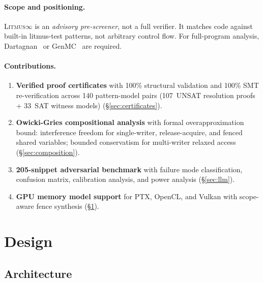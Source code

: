 \documentclass[11pt]{article}
\newcommand{\litmus}{\textsc{Litmus$\infty$}}
\begin{document}
\paragraph{Scope and positioning.}
\litmus{} is an \emph{advisory pre-screener}, not a full verifier.
It matches code against built-in litmus-test patterns, not
arbitrary control flow.  For full-program analysis, Dartagnan~\cite{Gavrilenko2019}
or GenMC~\cite{Kokologiannakis2019} are required.

\paragraph{Contributions.}
\begin{enumerate}[nosep]
\item \textbf{Verified proof certificates} with 100\% structural
  validation and 100\% SMT re-verification across 140 pattern-model
  pairs (107~UNSAT resolution proofs + 33~SAT witness models)
  (\S\ref{sec:certificates}).
\item \textbf{Owicki-Gries compositional analysis} with formal
  overapproximation bound: interference freedom for single-writer,
  release-acquire, and fenced shared variables; bounded conservatism
  for multi-writer relaxed access (\S\ref{sec:composition}).
\item \textbf{205-snippet adversarial benchmark} with failure mode
  classification, confusion matrix, calibration analysis, and
  power analysis (\S\ref{sec:llm}).
\item \textbf{GPU memory model support} for PTX, OpenCL, and
  Vulkan with scope-aware fence synthesis (\S\ref{sec:design}).
\end{enumerate}

\section{Design}
\label{sec:design}

\subsection{Architecture}
\end{document}
